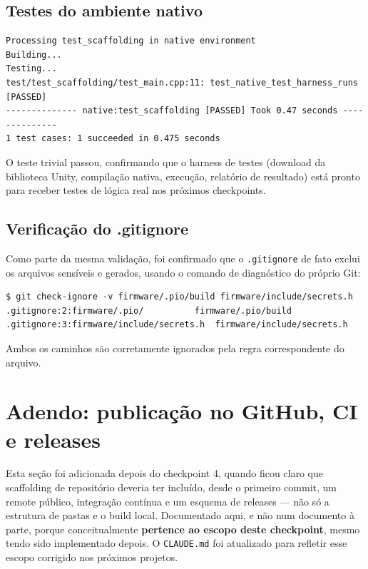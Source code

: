 \documentclass[11pt,a4paper]{article}
\begin{document}
\subsection{Testes do ambiente nativo}

\begin{lstlisting}[caption={Saída de \texttt{pio test -e native}}]
Processing test_scaffolding in native environment
Building...
Testing...
test/test_scaffolding/test_main.cpp:11: test_native_test_harness_runs [PASSED]
-------------- native:test_scaffolding [PASSED] Took 0.47 seconds --------------
1 test cases: 1 succeeded in 0.475 seconds
\end{lstlisting}

O teste trivial passou, confirmando que o harness de testes (download da biblioteca Unity, compilação nativa, execução, relatório de resultado) está pronto para receber testes de lógica real nos próximos checkpoints.

\subsection{Verificação do .gitignore}

Como parte da mesma validação, foi confirmado que o \texttt{.gitignore} de fato exclui os arquivos sensíveis e gerados, usando o comando de diagnóstico do próprio Git:

\begin{lstlisting}[caption={Verificação do .gitignore}]
$ git check-ignore -v firmware/.pio/build firmware/include/secrets.h
.gitignore:2:firmware/.pio/          firmware/.pio/build
.gitignore:3:firmware/include/secrets.h  firmware/include/secrets.h
\end{lstlisting}

Ambos os caminhos são corretamente ignorados pela regra correspondente do arquivo.

\section{Adendo: publicação no GitHub, CI e releases}
\label{sec:ci-releases}

Esta seção foi adicionada depois do checkpoint 4, quando ficou claro que scaffolding de repositório deveria ter incluído, desde o primeiro commit, um remote público, integração contínua e um esquema de releases --- não só a estrutura de pastas e o build local. Documentado aqui, e não num documento à parte, porque conceitualmente \textbf{pertence ao escopo deste checkpoint}, mesmo tendo sido implementado depois. O \texttt{CLAUDE.md} foi atualizado para refletir esse escopo corrigido nos próximos projetos.
\end{document}
